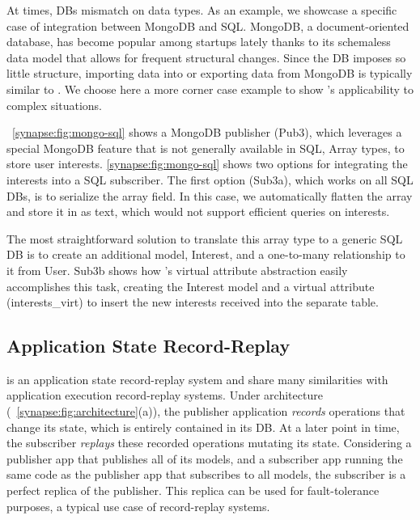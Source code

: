 At times, DBs mismatch on data types.  As an example, we showcase a specific
case of integration between MongoDB and SQL.
MongoDB, a document-oriented database, has become popular among startups
lately thanks to its schemaless data model that allows for frequent
structural changes.  Since the DB imposes so little structure, importing data
into or exporting data from MongoDB is typically similar to
\label{synapse:fig:mongo-to-star}. We choose here a more corner case example to
show \synapse's applicability to complex situations.

\F~\ref{synapse:fig:mongo-sql} shows a MongoDB publisher (Pub3), which leverages a
special MongoDB feature that is not generally available in SQL,
Array types, to store user interests.  \F\ref{synapse:fig:mongo-sql} shows two options
for integrating the interests into a SQL subscriber.  The first option (Sub3a),
which works on all SQL DBs, is to serialize the array field.
In this case, we automatically flatten the array and store it in as text, which would not support efficient queries on interests.

The most straightforward solution to translate this array type to a generic SQL DB is to create an additional model, {\code \footnotesize Interest}, and a one-to-many relationship to it from {\code \footnotesize User}.
Sub3b shows how \synapse's virtual attribute abstraction easily accomplishes
this task, creating the {\code \footnotesize Interest} model and a virtual
attribute  ({\code \footnotesize interests\_virt}) to insert the new interests
received into the separate table.


\subsection{Application State Record-Replay}
\label{synapse:s:record-replay}

\synapse is an application state record-replay system and share many
similarities with application execution record-replay systems.
Under \synapse architecture (\F~\ref{synapse:fig:architecture}(a)), the
publisher application {\em records} operations that
change its state, which is entirely contained in its DB.  At a later
point in time, the subscriber {\em replays} these recorded operations mutating
its state. Considering a publisher app that publishes all of its models, and a
subscriber app running the same code as the publisher app that subscribes to all
models, the subscriber is a perfect replica of the publisher. This replica
can be used for fault-tolerance purposes, a typical use case of record-replay systems.

